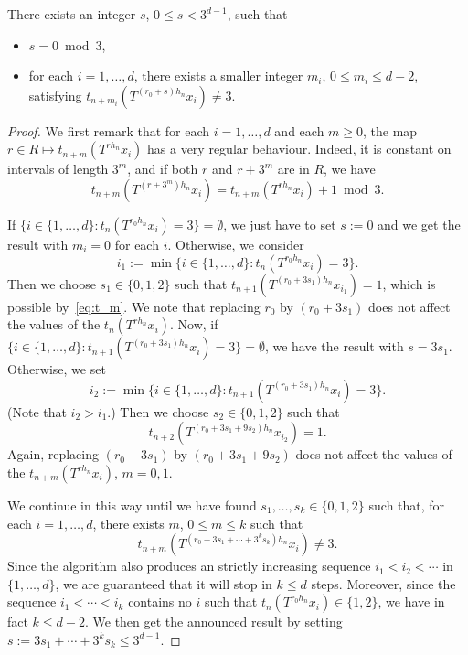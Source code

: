 \documentclass[AHL,Unicode,longabstracts]{cedram}
\newcommand{\egdef}{:=}
\begin{document}
\begin{lemm}\label{lemma:sameS}
There exists an integer $s$, $0\le s<3^{d-1}$, such that
\begin{itemize}
\item $s=0\bmod 3$,
\item for each $i=1,\ldots,d$, there exists a smaller integer $m_i$, $0\le m_i\le d-2$, satisfying $t_{n+m_i}(T^{(r_0+s)h_n}x_i)\neq 3$.
\end{itemize}
\end{lemm}
\begin{proof}
We first remark that for each $i=1,\ldots,d$ and each $m\ge0$, the map $r\in R\mapsto t_{n+m}(T^{rh_n}x_i)$ has a very regular behaviour. Indeed, it is constant on intervals of length $3^m$, and if both $r$ and $r+3^m$ are in $R$, we have
\begin{equation}\label{eq:t_m}
t_{n+m}(T^{(r+3^m)h_n}x_i) = t_{n+m}(T^{rh_n}x_i) + 1 \bmod 3.
\end{equation}

If $\bigl\{i\in\{1,\ldots,d\}:t_n(T^{r_0h_n}x_i)=3\bigr\}=\emptyset$, we just have to set $s\egdef 0$ and we get the result with $m_i=0$ for each $i$. Otherwise, we consider
\[
i_1 \egdef \min \bigl\{i\in\{1,\ldots,d\}:t_n(T^{r_0h_n}x_i)=3 \bigr\}.
\]
Then we choose $s_1\in\{0,1,2\}$ such that $t_{n+1}(T^{(r_0+3s_1)h_n}x_{i_1})=1$, which is possible by~\eqref{eq:t_m}. We note that replacing $r_0$ by $(r_0+3s_1)$ does not affect the values of the $t_n(T^{rh_n}x_i)$. Now, if $\bigl\{i\in\{1,\ldots,d\}:t_{n+1}(T^{(r_0+3s_1)h_n}x_i)=3\bigr\}=\emptyset$, we have the result with $s=3s_1$. Otherwise, we set
\[
i_2 \egdef \min \bigl\{i\in\{1,\ldots,d\}:t_{n+1}(T^{(r_0+3s_1)h_n}x_i)=3 \bigr\}.
\]
(Note that $i_2>i_1$.) Then we choose $s_2\in\{0,1,2\}$ such that
\[
t_{n+2}(T^{(r_0+3s_1+9s_2)h_n}x_{i_2})=1.
\]
Again, replacing $(r_0+3s_1)$ by $(r_0+3s_1+9s_2)$ does not affect the values of the $t_{n+m}(T^{rh_n}x_i)$, $m=0,1$.

We continue in this way until we have found $s_1,\ldots,s_k\in\{0,1,2\}$ such that, for each $i=1,\ldots,d$, there exists $m$, $0\le m\le k$ such that
\[
t_{n+m}(T^{(r_0+3s_1+\cdots+3^ks_k)h_n}x_i)\neq3.
\]
Since the algorithm also produces an strictly increasing sequence $i_1<i_2<\cdots$ in $\{1,\ldots,d\}$, we are guaranteed that it will stop in $k\le d$ steps. Moreover, since the sequence $i_1<\cdots<i_k$ contains no $i$ such that $t_n(T^{r_0h_n}x_i)\in\{1,2\}$, we have in fact $k\le d-2$. We then get the announced result by setting $s\egdef 3s_1+\cdots+3^ks_k\le 3^{d-1}$.
\end{proof}
\end{document}
